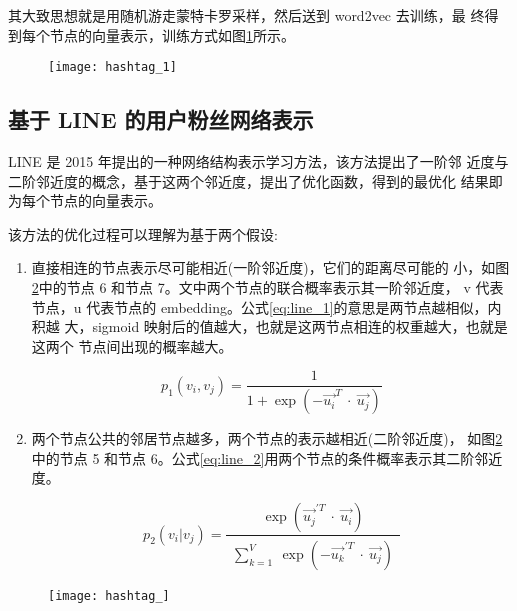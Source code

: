 其大致思想就是用随机游走蒙特卡罗采样，然后送到 word2vec 去训练，最 终得到每个节点的向量表示，训练方式如图\ref{fig:piu_1}所示。


\begin{figure}[H]
    \centering
    \texttt{[image: hashtag\_1]}
    \label{fig:piu_1}
\end{figure}

\subsection{基于 LINE 的用户粉丝网络表示}
LINE 是 2015 年提出的一种网络结构表示学习方法，该方法提出了一阶邻 近度与二阶邻近度的概念，基于这两个邻近度，提出了优化函数，得到的最优化 结果即为每个节点的向量表示\citep{Tang2015LINE}。

该方法的优化过程可以理解为基于两个假设:
\begin{enumerate}


\item 直接相连的节点表示尽可能相近(一阶邻近度)，它们的距离尽可能的 小，如图\ref{fig:piu_2}中的节点 6 和节点 7。文中两个节点的联合概率表示其一阶邻近度， v 代表节点，u 代表节点的 embedding。公式\ref{eq:line_1}的意思是两节点越相似，内积越 大，sigmoid 映射后的值越大，也就是这两节点相连的权重越大，也就是这两个 节点间出现的概率越大。

\begin{equation}\label{eq:line_1}
	p_1(v_i,v_j) = \frac{1}{1 + \exp(-\overrightarrow{u_i}^{T} ~\cdot~ \overrightarrow{u_j})}
\end{equation}

\item 两个节点公共的邻居节点越多，两个节点的表示越相近(二阶邻近度)，
如图\ref{fig:piu_2}中的节点 5 和节点 6。公式\ref{eq:line_2}用两个节点的条件概率表示其二阶邻近度。

\begin{equation}\label{eq:line_2}
	p_2(v_i|v_j) = \frac{\exp(\overrightarrow{u_j}^{\prime T}~\cdot~\overrightarrow{u_i})}{\begin{matrix}
	\sum_{k=1}^V ~\exp(-\overrightarrow{u_k}^{\prime T} ~\cdot~ \overrightarrow{u_j})
\end{matrix}	 }
\end{equation}


\end{enumerate}

\begin{figure}[H]
    \centering
    \texttt{[image: hashtag\_]}
    \label{fig:piu_2}
\end{figure}

